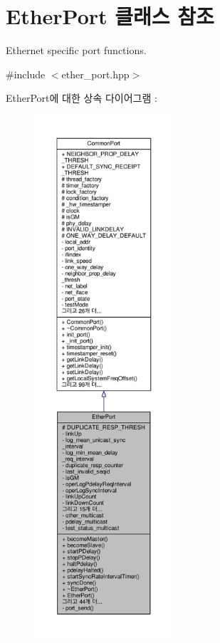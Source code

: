 \hypertarget{class_ether_port}{}\section{Ether\+Port 클래스 참조}
\label{class_ether_port}


Ethernet specific port functions.  




{\ttfamily \#include $<$ether\+\_\+port.\+hpp$>$}



Ether\+Port에 대한 상속 다이어그램 \+: 
\nopagebreak
\begin{figure}[H]
\begin{center}
\leavevmode
\includegraphics[height=550pt]{class_ether_port__inherit__graph}
\end{center}
\end{figure}


